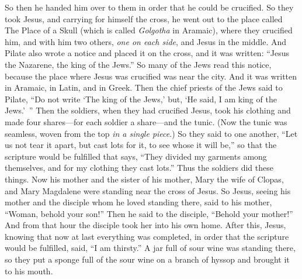 \begin{biblechapter}
\verse So then he handed him over to them in order that he could be crucified.
 So they took Jesus,
\verse and carrying for himself the cross, he went out to the place called The Place of a Skull (which is called \textit{Golgotha} in Aramaic),
\verse where they crucified him, and with him two others, \textit{one on each side}, and Jesus in the middle.
\verse And Pilate also wrote a notice and placed it on the cross, and it was written: “Jesus the Nazarene, the king of the Jews.”
\verse So many of the Jews read this notice, because the place where Jesus was crucified was near the city. And it was written in Aramaic, in Latin, and in Greek.
\verse Then the chief priests of the Jews said to Pilate, “Do not write ‘The king of the Jews,’ but, ‘He said, I am king of the Jews.’ ”
\verse Then the soldiers, when they had crucified Jesus, took his clothing and made four shares—for each soldier a share—and the tunic. (Now the tunic was seamless, woven from the top \textit{in a single piece}.)
\verse So they said to one another, “Let us not tear it apart, but cast lots for it, to see whose it will be,” so that the scripture would be fulfilled that says, “They divided my garments among themselves, 
and for my clothing they cast lots.” Thus the soldiers did these things.
\verse Now his mother and the sister of his mother, Mary the wife of Clopas, and Mary Magdalene were standing near the cross of Jesus.
\verse So Jesus, seeing his mother and the disciple whom he loved standing there, said to his mother, “Woman, behold your son!”
\verse Then he said to the disciple, “Behold your mother!” And from that hour the disciple took her into his own home.
 After this, Jesus, knowing that now at last everything was completed, in order that the scripture would be fulfilled, said, “I am thirsty.”
\verse A jar full of sour wine was standing there, so they put a sponge full of the sour wine on a branch of hyssop and brought it to his mouth.

\end{biblechapter}
